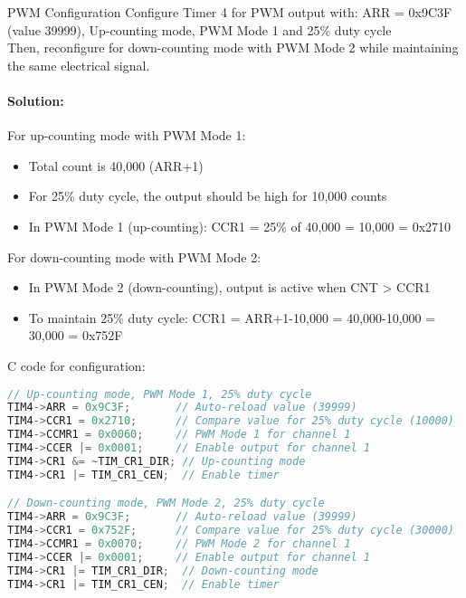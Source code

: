 \begin{example2}{PWM Configuration}
Configure Timer 4 for PWM output with: ARR = 0x9C3F (value 39999), Up-counting mode, PWM Mode 1 and 25\% duty cycle
\vspace{1mm}\\
Then, reconfigure for down-counting mode with PWM Mode 2 while maintaining the same electrical signal.
\paragraph{Solution:}
For up-counting mode with PWM Mode 1:
\begin{itemize}
    \item Total count is 40,000 (ARR+1)
    \item For 25\% duty cycle, the output should be high for 10,000 counts
    \item In PWM Mode 1 (up-counting): CCR1 = 25\% of 40,000 = 10,000 = 0x2710
\end{itemize}

For down-counting mode with PWM Mode 2:
\begin{itemize}
    \item In PWM Mode 2 (down-counting), output is active when CNT > CCR1
    \item To maintain 25\% duty cycle: CCR1 = ARR+1-10,000 = 40,000-10,000 = 30,000 = 0x752F
\end{itemize}

C code for configuration:
\begin{lstlisting}[language=C, style=basesmol]
// Up-counting mode, PWM Mode 1, 25% duty cycle
TIM4->ARR = 0x9C3F;       // Auto-reload value (39999)
TIM4->CCR1 = 0x2710;      // Compare value for 25% duty cycle (10000)
TIM4->CCMR1 = 0x0060;     // PWM Mode 1 for channel 1
TIM4->CCER |= 0x0001;     // Enable output for channel 1
TIM4->CR1 &= ~TIM_CR1_DIR; // Up-counting mode
TIM4->CR1 |= TIM_CR1_CEN;  // Enable timer

// Down-counting mode, PWM Mode 2, 25% duty cycle
TIM4->ARR = 0x9C3F;       // Auto-reload value (39999)
TIM4->CCR1 = 0x752F;      // Compare value for 25% duty cycle (30000)
TIM4->CCMR1 = 0x0070;     // PWM Mode 2 for channel 1
TIM4->CCER |= 0x0001;     // Enable output for channel 1
TIM4->CR1 |= TIM_CR1_DIR;  // Down-counting mode
TIM4->CR1 |= TIM_CR1_CEN;  // Enable timer
\end{lstlisting}
\end{example2}





